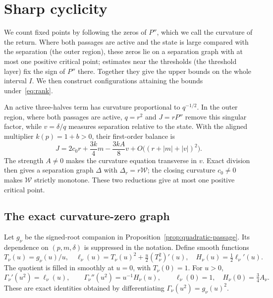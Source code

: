 \section{Sharp cyclicity}
\label{sec:curvature-graph}

We count fixed points by following the zeros of $P''$, which we call the
curvature of the return. Where both passages are active and the state is
large compared with the separation (the outer region), these zeros lie on a
separation graph with at most one positive critical point; estimates near the
thresholds (the threshold layer) fix the sign of $P''$ there. Together they
give the upper bounds on the whole interval $I$. We then construct
configurations attaining the bounds under~\eqref{eq:rank}.

An active three-halves term has curvature proportional to \(q^{-1/2}\).
In the outer region, where both passages are active, \(q=r^2\) and \(J=rP''\) remove
this singular factor, while \(v=\delta/q\) measures separation relative
to the state. With the aligned multiplier \(k(p)=1+b>0\), their first-order balance is
\[
 J=2c_0r+\frac{3k}{4}m-\frac{3kA}{8}v
       +O\bigl((r+|m|+|v|)^2\bigr).
\]
The strength $A\ne0$ makes the curvature equation transverse in $v$.
Exact division then gives a separation graph $\Delta$ with
$\Delta_r=r\mathcal W$; the closing curvature $c_0\ne0$ makes
$\mathcal W$ strictly monotone. These two reductions give at most one
positive critical point.

\subsection{The exact curvature-zero graph}

Let \(g_\nu\) be the signed-root companion in
Proposition~\ref{prop:quadratic-passage}. Its dependence on
\((p,m,\delta)\) is suppressed in the notation. Define smooth functions
\begin{equation}\label{eq:root-profiles}
 T_\nu(u)=g_\nu(u)/u,\quad
 \ell_\nu(u)=T_\nu(u)^2+\tfrac{u}{2}(T_\nu^2)'(u),
 \quad H_\nu(u)=\tfrac12\ell_\nu'(u).
\end{equation}
The quotient is filled in smoothly at \(u=0\), with \(T_\nu(0)=1\).
For \(u>0\),
\begin{equation}\label{eq:passage-derivatives}
 \Gamma_\nu'(u^2)=\ell_\nu(u),\qquad
 \Gamma_\nu''(u^2)=u^{-1}H_\nu(u),\qquad
 \ell_\nu(0)=1,\quad H_\nu(0)=\tfrac34 A_\nu.
\end{equation}
These are exact identities obtained by differentiating
\(\Gamma_\nu(u^2)=g_\nu(u)^2\).

